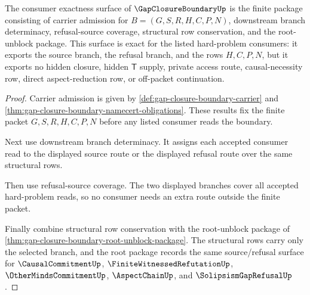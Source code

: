 \begin{theorem}
\label{thm:gap-closure-boundary-consumer-exactness-package}
The consumer exactness surface of $\GapClosureBoundaryUp$ is the finite package consisting of carrier admission for $B=(G,S,R,H,C,P,N)$, downstream branch determinacy, refusal-source coverage, structural row conservation, and the root-unblock package. This surface is exact for the listed hard-problem consumers: it exports the source branch, the refusal branch, and the rows $H,C,P,N$, but it exports no hidden closure, hidden $\mathsf{T}$ supply, private access route, causal-necessity row, direct aspect-reduction row, or off-packet continuation.
\end{theorem}
\begin{proof}
Carrier admission is given by \autoref{def:gap-closure-boundary-carrier} and \autoref{thm:gap-closure-boundary-namecert-obligations}. These results fix the finite packet $G,S,R,H,C,P,N$ before any listed consumer reads the boundary.

Next use downstream branch determinacy. It assigns each accepted consumer read to the displayed source route or the displayed refusal route over the same structural rows.

Then use refusal-source coverage. The two displayed branches cover all accepted hard-problem reads, so no consumer needs an extra route outside the finite packet.

Finally combine structural row conservation with the root-unblock package of \autoref{thm:gap-closure-boundary-root-unblock-package}. The structural rows carry only the selected branch, and the root package records the same source/refusal surface for $\CausalCommitmentUp$, $\FiniteWitnessedRefutationUp$, $\OtherMindsCommitmentUp$, $\AspectChainUp$, and $\SolipsismGapRefusalUp$.
\end{proof}

